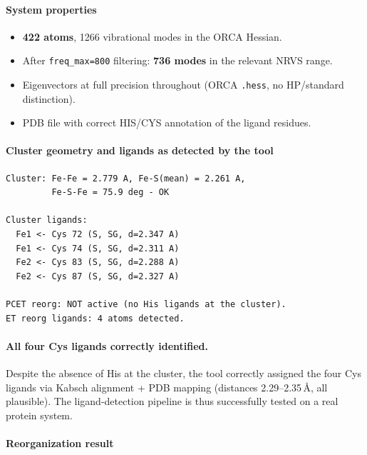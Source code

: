 \documentclass[11pt,a4paper,twoside]{article}
\providecommand{\angstrom}{\text{\AA}}    %
\theoremstyle{remark}
\begin{document}
\paragraph{System properties}
\begin{itemize}\setlength{\itemsep}{0pt}
  \item \textbf{422 atoms}, 1266 vibrational modes in the ORCA
        Hessian.
  \item After \texttt{freq\_max=800} filtering: \textbf{736 modes}
        in the relevant NRVS range.
  \item Eigenvectors at full precision throughout (ORCA
        \texttt{.hess}, no HP/standard distinction).
  \item PDB file with correct HIS/CYS annotation of the ligand
        residues.
\end{itemize}

\paragraph{Cluster geometry and ligands as detected by the tool}

\begin{verbatim}
Cluster: Fe-Fe = 2.779 A, Fe-S(mean) = 2.261 A,
         Fe-S-Fe = 75.9 deg - OK

Cluster ligands:
  Fe1 <- Cys 72 (S, SG, d=2.347 A)
  Fe1 <- Cys 74 (S, SG, d=2.311 A)
  Fe2 <- Cys 83 (S, SG, d=2.288 A)
  Fe2 <- Cys 87 (S, SG, d=2.327 A)

PCET reorg: NOT active (no His ligands at the cluster).
ET reorg ligands: 4 atoms detected.
\end{verbatim}

\paragraph{All four Cys ligands correctly identified.}
Despite the absence of His at the cluster, the tool correctly
assigned the four Cys ligands via Kabsch alignment + PDB mapping
(distances 2.29--2.35\,$\angstrom$, all plausible). The
ligand-detection pipeline is thus successfully tested on a real
protein system.

\paragraph{Reorganization result}
\end{document}
